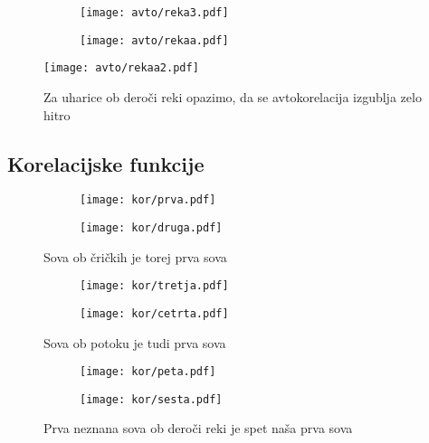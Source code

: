 \documentclass{article}
\begin{document}
\begin{figure}[H]
\begin{subfigure}{.5\textwidth}
\texttt{[image: avto/reka3.pdf]}
\end{subfigure}
\begin{subfigure}{.5\textwidth}
\texttt{[image: avto/rekaa.pdf]}
\end{subfigure}
\end{figure}

\begin{figure}[H]
\centering
\texttt{[image: avto/rekaa2.pdf]}
\caption*{Za uharice ob deroči reki opazimo, da se avtokorelacija izgublja zelo hitro}
\end{figure}

\subsection{Korelacijske funkcije}

\begin{figure}[H]
\begin{subfigure}{.5\textwidth}
\texttt{[image: kor/prva.pdf]}
\end{subfigure}
\begin{subfigure}{.5\textwidth}
\texttt{[image: kor/druga.pdf]}
\end{subfigure}
\caption*{Sova ob čričkih je torej prva sova}
\end{figure}

\begin{figure}[H]
\begin{subfigure}{.5\textwidth}
\texttt{[image: kor/tretja.pdf]}
\end{subfigure}
\begin{subfigure}{.5\textwidth}
\texttt{[image: kor/cetrta.pdf]}
\end{subfigure}
\caption*{Sova ob potoku je tudi prva sova}
\end{figure}

\begin{figure}[H]
\begin{subfigure}{.5\textwidth}
\texttt{[image: kor/peta.pdf]}
\end{subfigure}
\begin{subfigure}{.5\textwidth}
\texttt{[image: kor/sesta.pdf]}
\end{subfigure}
\caption*{Prva neznana sova ob deroči reki je spet naša prva sova}
\end{figure}
\end{document}
